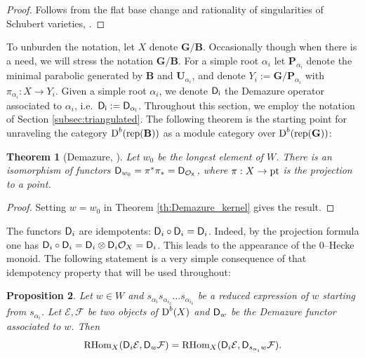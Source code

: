 \documentclass[sn-mathphys-num]{sn-jnl}%
\newcommand{\Oo}{\mathcal O}
\newcommand{\Ff}{\mathcal F}
\newcommand{\Ee}{\mathcal E}
\newcommand{\rep}{{\mathrm{rep}}}
\newcommand*{\Dd}{\mathop{\mathrm D\kern0pt}\nolimits}
\newcommand*{\RHom}{\mathop{\mathrm {RHom}}\nolimits}
\newcommand{\sd}{\sf D}
\newcommand{\bg}{\mathbf G}
\newcommand{\fb}{\mathbf B}
\newcommand{\bp}{\mathbf P}
\newcommand{\bu}{\mathbf U}
\newtheorem{theorem}{Theorem}[section]
\newtheorem{proposition}[theorem]{Proposition}
\theoremstyle{definition}
\begin{document}
\begin{proof}
Follows from the flat base change and 
rationality of singularities of Schubert varieties, \cite{And}.
\end{proof}


To unburden the notation, let $X$ denote ${ \bg}/{\fb}$. Occasionally though when there is a need, we will stress the notation ${ \bg}/{\fb}$. For a simple root $\alpha _i$ let ${\bp}_{\alpha _i}$ denote the minimal parabolic generated by ${\fb}$ and $\bu_{\alpha _i}$, and denote $Y_i:={ \bg}/{\bp}_{\alpha _i}$ with $\pi _{\alpha _i}: X\rightarrow Y_i$. Given a simple root $\alpha_ i$, we denote $\sd _i$ the Demazure operator associated to $\alpha_ i$, i.e.\ $\sd _i:=\sd _{\alpha _i}$.
Throughout this section, we employ the notation of Section \ref{subsec:triangulated}. The following theorem is the starting point for unraveling the category $\Dd ^b({\rep}({\fb}))$ as a module category over  $\Dd ^b({\rep}( \bg))$:

\begin{theorem}[Demazure, \cite{Demres}]\label{th:Demw0}
Let $w_0$ be the longest element of $W$.
There is an isomorphism of functors ${\sd}_{w_0}=\pi ^{\ast}\pi _{\ast}=\sd _{\Oo _X}$, where $\pi:X\rightarrow {\rm pt}$ is the projection to a point.
\end{theorem}

\begin{proof}
Setting $w=w_0$ in Theorem \ref{th:Demazure_kernel} gives the result. 
\end{proof}

The functors ${\sd }_i$ are idempotents: ${\sd }_i\circ {\sd }_i={\sd }_i$. Indeed, by the projection formula one has ${\sd }_i\circ {\sd }_i={\sd }_i\otimes {\sd }_i\Oo _X={\sd }_i$. This leads to the appearance of the $0$--Hecke monoid. The following statement is a very simple consequence of that idempotency property that will be used throughout:

\begin{proposition}\label{prop:Demazure_reduction}
Let $w\in W$ and $s_{\alpha _i}s_{\alpha _{i_2}}\dots s_{\alpha _{i_k}}$ be a reduced expression of $w$ starting from $s_{\alpha _i}$. Let $\Ee, \Ff$ be two objects of $\Dd ^b(X)$ and ${\sf D}_w$ be the Demazure functor associated to $w$. Then 
\begin{equation}\label{eq:Demazure_reduction}
\RHom _X({\sf D}_i\Ee,{\sf D}_w\Ff)=\RHom _X({\sf D}_i\Ee,{\sf D}_{s_{\alpha _i}w}\Ff).
\end{equation}
\end{proposition}
\end{document}
